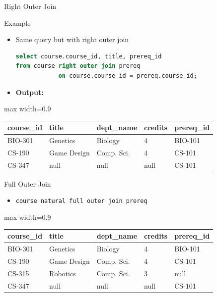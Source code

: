 \documentclass[aspectratio=169, xcolor=dvipsnames]{beamer}
\begin{document}
\begin{frame}[fragile]{Right Outer Join}
    \begin{exampleblock}{Example}
        \begin{itemize}[<+->]
            \item Same query but with right outer join
            \begin{lstlisting}[language=SQL]
select course.course_id, title, prereq_id 
from course right outer join prereq 
            on course.course_id = prereq.course_id;
            \end{lstlisting}
            \item \textbf{Output:}
        \end{itemize}
    \end{exampleblock}
    \begin{center}
        \begin{adjustbox}{max width=0.9\textwidth}
        \begin{tabular}{|l|l|l|l|l|}
        \hline
        \textbf{course\_id} & \textbf{title} & \textbf{dept\_name} & \textbf{credits} & \textbf{prereq\_id} \\ \hline
        BIO-301 & Genetics & Biology & 4 & BIO-101 \\ \hline
        CS-190 & Game Design & Comp. Sci. & 4 & CS-101 \\ \hline
        CS-347 & null & null & null & CS-101 \\ \hline
        \end{tabular}
        \end{adjustbox}
    \end{center}
\end{frame}

\begin{frame}[fragile]{Full Outer Join}
    \begin{itemize}
        \item \texttt{course natural full outer join prereq}
    \end{itemize}
    \begin{center}
        \begin{adjustbox}{max width=0.9\textwidth}
        \begin{tabular}{|l|l|l|l|l|}
        \hline
        \textbf{course\_id} & \textbf{title} & \textbf{dept\_name} & \textbf{credits} & \textbf{prereq\_id} \\ \hline
        BIO-301 & Genetics & Biology & 4 & BIO-101 \\ \hline
        CS-190 & Game Design & Comp. Sci. & 4 & CS-101 \\ \hline
        CS-315 & Robotics & Comp. Sci. & 3 & null \\ \hline
        CS-347 & null & null & null & CS-101 \\ \hline
        \end{tabular}
        \end{adjustbox}
    \end{center}
\end{frame}
\end{document}
